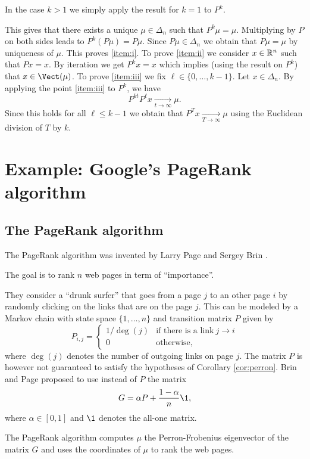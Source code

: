 \documentclass[11pt,nocut]{article}
\begin{document}
In the case $k > 1$ we simply apply the result for $k=1$ to $P^k$.

This gives that there exists a unique $\mu \in \Delta_n$ such that $P^k \mu = \mu$. Multiplying by $P$ on both sides leads to $P^k (P\mu) = P\mu$. 
Since $P\mu \in \Delta_n$ we obtain that $P\mu = \mu$ by uniqueness of $\mu$. This proves \ref{item:i}. To prove \ref{item:ii} we consider $x \in \mathbb{R}^n$ such that $P x = x$. By iteration we get $P^k x = x$ which implies (using the result on $P^k$) that $x \in \Vect(\mu)$.
To prove \ref{item:iii} we fix $\ell \in \{0, \dots, k-1\}$. Let $x \in \Delta_n$. By applying the point \ref{item:iii} to $P^k$, we have 
$$
P^{kt} P^{\ell} x \xrightarrow[t \to \infty]{} \mu.
$$
Since this holds for all $\ell \leq k-1$ we obtain that $P^T x \xrightarrow[T \to \infty]{} \mu$ using the Euclidean division of $T$ by $k$.

\section{Example: Google's PageRank algorithm}

\subsection{The PageRank algorithm}

The PageRank algorithm was invented by Larry Page and Sergey Brin \cite{page1999pagerank}.

The goal is to rank $n$ web pages in term of ``importance''.

They consider a ``drunk surfer'' that goes from a page $j$ to an other page $i$ by randomly clicking on the links that are on the page $j$.
This can be modeled by a Markov chain with state space $\{1, \dots, n\}$ and transition matrix $P$ given by
$$
P_{i,j} 
= 
\begin{cases}
	1 / \deg(j) & \text{if there is a link} \ j \to i \\
	0 & \text{otherwise},
\end{cases}
$$
where $\deg(j)$ denotes the number of outgoing links on page $j$.
The matrix $P$ is however not guaranteed to satisfy the hypotheses of Corollary \ref{cor:perron}. Brin and Page proposed to use instead of $P$ the matrix
$$
G = \alpha P + \frac{1-\alpha}{n} \1,
$$
where $\alpha \in [0,1]$ and $\1$ denotes the all-one matrix.

The PageRank algorithm computes $\mu$ the Perron-Frobenius eigenvector of the matrix $G$ and uses the coordinates of $\mu$ to rank the web pages.
\end{document}
